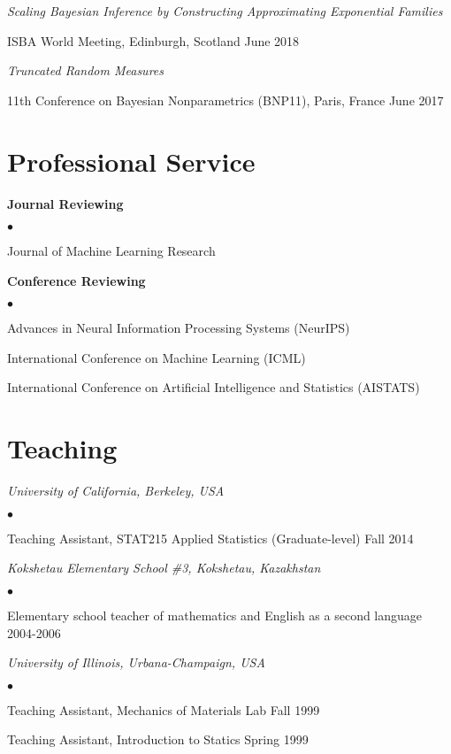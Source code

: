 \documentclass[margin,line]{res}
\newenvironment{list2}{
  \begin{list}{$\bullet$}{%
      \setlength{\itemsep}{0in}
      \setlength{\parsep}{0in} \setlength{\parskip}{0in}
      \setlength{\topsep}{0in} \setlength{\partopsep}{0in}
      \setlength{\leftmargin}{0.2in}}}{\end{list}}
\newenvironment{talkgroup}{\setlength{\parskip}{3pt}\everypar{\hangafter=1\hangindent=1em\relax}\par}{\par\everypar{\hangafter=0\relax}}
\begin{document}
\begin{resume}
\emph{Scaling Bayesian Inference by Constructing Approximating Exponential Families}
\begin{talkgroup}
ISBA World Meeting, Edinburgh, Scotland \hfill June 2018
\end{talkgroup}

\emph{Truncated Random Measures}
\begin{talkgroup}
11th Conference on Bayesian Nonparametrics (BNP11), Paris, France \hfill June 2017
\end{talkgroup}

\section{\sc Professional Service}

\textbf{Journal Reviewing}
\begin{list2}
\item Journal of Machine Learning Research
\end{list2}

\textbf{Conference Reviewing}
\begin{list2}
\item Advances in Neural Information Processing Systems (NeurIPS)
\item International Conference on Machine Learning (ICML)
\item International Conference on Artificial Intelligence and Statistics (AISTATS)
\end{list2}


\section{\sc Teaching}

\emph{University of California, Berkeley, USA}
\begin{list2}
\item Teaching Assistant, STAT215 Applied Statistics
(Graduate-level) \hfill Fall 2014
\end{list2}

\emph{Kokshetau Elementary School \#3, Kokshetau, Kazakhstan}
\begin{list2}
\item Elementary school teacher of mathematics and English as a second language
\hfill 2004-2006
\end{list2}

\emph{University of Illinois, Urbana-Champaign, USA}
\begin{list2}
\item Teaching Assistant, Mechanics of Materials Lab \hfill Fall 1999
\item Teaching Assistant, Introduction to Statics \hfill Spring 1999
\end{list2}




\end{resume}
\end{document}

